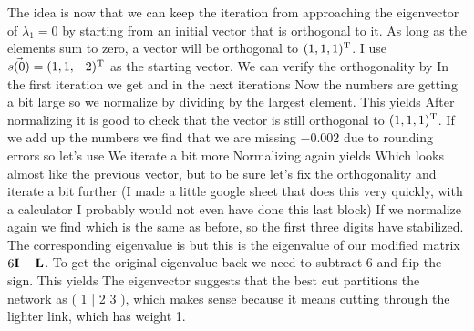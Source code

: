 The idea is now that we can keep the iteration from approaching the eigenvector of $\lambda_1=0$ by starting from an initial vector that is orthogonal to it. 
As long as the elements sum to zero, a vector will be orthogonal to $(1,1,1)^{\rm T}$. I use $\vec{s(0)}=(1,1,-2)^{\rm T}$ as the starting vector. We can verify the orthogonality by 
In the first iteration we get
and in the next iterations 
Now the numbers are getting a bit large so we normalize by dividing by the largest element. This yields 
After normalizing it is good to check that the vector is still orthogonal to $(1,1,1)^{\rm T}$. If we add up the numbers we find that we are missing $-0.002$ due to rounding errors so let's use 
We iterate a bit more 
Normalizing again yields 
Which looks almost like the previous vector, but to be sure let's 
fix the orthogonality 
and iterate a bit further (I made a little google sheet that does this very quickly, with a calculator I probably would not even have done this last block)
If we normalize again we find 
which is the same as before, so the first three digits have stabilized. The corresponding eigenvalue is 
but this is the eigenvalue of our modified matrix $6{\bf I}-{\bf L}$. To get the original eigenvalue back we need to subtract 6 and flip the sign. This yields 
The eigenvector suggests that the best cut partitions the network as ( 1 | 2 3 ), which makes sense because it means cutting through the lighter link, which has weight 1. 